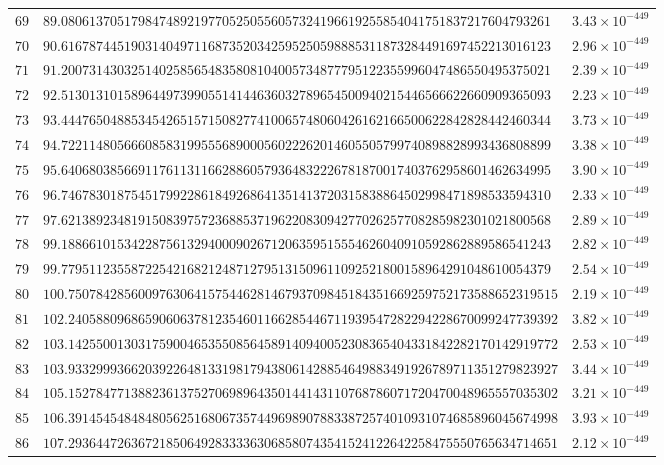 \documentclass[12pt,reqno]{amsart}
\theoremstyle{remark}
\begin{document}
\begin{longtable}{clc}
$69$ & $89.0806137051798474892197705250556057324196619255854041751837217604793261$ & $3.43\times 10^{-449}$ \\
$70$ & $90.6167874451903140497116873520342595250598885311873284491697452213016123$ & $2.96\times 10^{-449}$ \\
$71$ & $91.2007314303251402585654835808104005734877795122355996047486550495375021$ & $2.39\times 10^{-449}$ \\
$72$ & $92.5130131015896449739905514144636032789654500940215446566622660909365093$ & $2.23\times 10^{-449}$ \\
$73$ & $93.4447650488534542651571508277410065748060426162166500622842828442460344$ & $3.73\times 10^{-449}$ \\
$74$ & $94.7221148056660858319955568900056022262014605505799740898828993436808899$ & $3.38\times 10^{-449}$ \\
$75$ & $95.6406803856691176113116628860579364832226781870017403762958601462634995$ & $3.90\times 10^{-449}$ \\
$76$ & $96.7467830187545179922861849268641351413720315838864502998471898533594310$ & $2.33\times 10^{-449}$ \\
$77$ & $97.6213892348191508397572368853719622083094277026257708285982301021800568$ & $2.89\times 10^{-449}$ \\
$78$ & $99.1886610153422875613294000902671206359515554626040910592862889586541243$ & $2.82\times 10^{-449}$ \\
$79$ & $99.7795112355872254216821248712795131509611092521800158964291048610054379$ & $2.54\times 10^{-449}$ \\
$80$ & $100.7507842856009763064157544628146793709845184351669259752173588652319515$ & $2.19\times 10^{-449}$ \\
$81$ & $102.2405880968659060637812354601166285446711939547282294228670099247739392$ & $3.82\times 10^{-449}$ \\
$82$ & $103.1425500130317590046535508564589140940052308365404331842282170142919772$ & $2.53\times 10^{-449}$ \\
$83$ & $103.9332999366203922648133198179438061428854649883491926789711351279823927$ & $3.44\times 10^{-449}$ \\
$84$ & $105.1527847713882361375270698964350144143110768786071720470048965557035302$ & $3.21\times 10^{-449}$ \\
$85$ & $106.3914545484848056251680673574496989078833872574010931074685896045674998$ & $3.93\times 10^{-449}$ \\
$86$ & $107.2936447263672185064928333363068580743541524122642258475550765634714651$ & $2.12\times 10^{-449}$ \\

\end{longtable}
\end{document}
